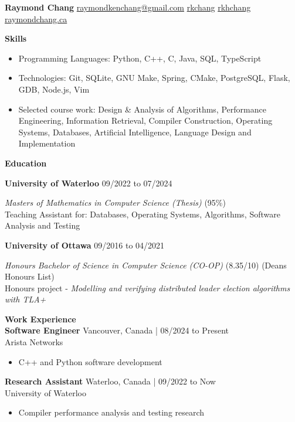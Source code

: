 \documentclass[10pt]{article}
\begin{document}
{\huge\textbf{Raymond Chang}} \space\space
{} \href{mailto:raymondkenchang@gmail.com}{raymondkenchang@gmail.com}  \space\space
{} \href{https://github.com/rkchang}{rkchang} \space\space
{} \href{https://linkedin.com/in/rkhchang}{rkhchang} \space\space
{} \href{https://raymondchang.ca/}{raymondchang.ca}

\bigskip

{\Large\textbf{Skills}}\space \hrulefill
\begin{itemize}
    \item Programming Languages: Python, C++, C, Java, SQL, TypeScript
    \item Technologies: Git, SQLite, GNU Make, Spring, CMake, PostgreSQL, Flask, GDB, Node.js, Vim
    \item Selected course work: Design \& Analysis of Algorithms, Performance Engineering, Information Retrieval, Compiler Construction, Operating Systems, Databases, Artificial Intelligence, Language Design and Implementation
\end{itemize}

\smallskip

{\Large\textbf{Education}}\space \hrulefill

\textbf{University of Waterloo} \hfill  09/2022 to 07/2024

\textit{Masters of Mathematics in Computer Science (Thesis)} (95\%) \\
Teaching Assistant for: Databases, Operating Systems, Algorithms, Software Analysis and Testing

\textbf{University of Ottawa} \hfill 09/2016 to 04/2021

\textit{Honours Bachelor of Science in Computer Science (CO-OP)} (8.35/10) (Deans Honours List) \\
Honours project - \textit{Modelling and verifying distributed leader election algorithms with TLA+}

\smallskip

{\Large\textbf{Work Experience}}\space \hrulefill \\
\textbf{Software Engineer} \hfill Vancouver, Canada | 08/2024 to Present \\
Arista Networks
\begin{itemize}
    \item C++ and Python software development
\end{itemize}
\textbf{Research Assistant} \hfill Waterloo, Canada | 09/2022 to Now \\
University of Waterloo
\begin{itemize}
    \item Compiler performance analysis and testing research
\end{itemize}
\end{document}
